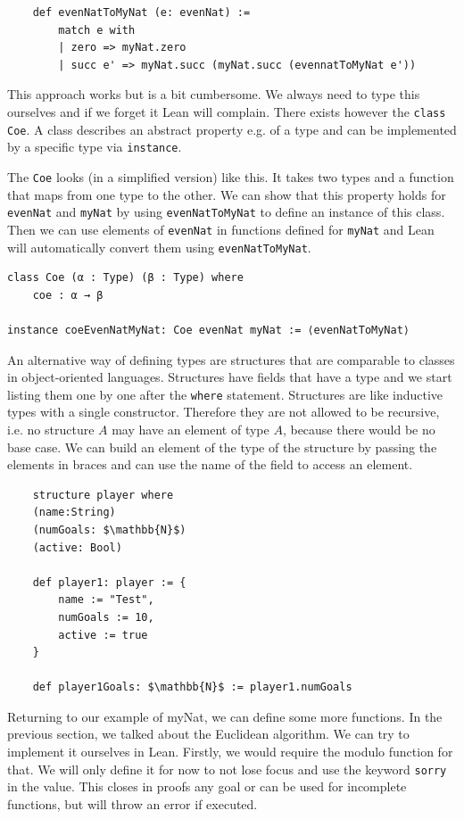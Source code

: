 \begin{lstlisting}
    def evenNatToMyNat (e: evenNat) := 
        match e with
        | zero => myNat.zero
        | succ e' => myNat.succ (myNat.succ (evennatToMyNat e'))
\end{lstlisting}

This approach works but is a bit cumbersome. We always need to type this ourselves and if we forget it Lean will complain. There exists however the \lstinline|class Coe|. A class describes an abstract property e.g. of a type and can be implemented by a specific type via \lstinline|instance|.

The \lstinline|Coe| looks (in a simplified version) like this. It takes two types and a function that maps from one type to the other. We can show that this property holds for \lstinline|evenNat| and \lstinline|myNat| by using \lstinline|evenNatToMyNat| to define an instance of this class. Then we can use elements of \lstinline|evenNat| in functions defined for \lstinline|myNat| and Lean will automatically convert them using \lstinline|evenNatToMyNat|.

\begin{lstlisting}
class Coe (α : Type) (β : Type) where
    coe : α → β

instance coeEvenNatMyNat: Coe evenNat myNat := ⟨evenNatToMyNat⟩
\end{lstlisting}

An alternative way of defining types are structures that are comparable to classes in object-oriented languages. Structures have fields that have a type and we start listing them one by one after the \lstinline|where| statement. Structures are like inductive types with a single constructor. Therefore they are not allowed to be recursive, i.e. no structure $A$ may have an element of type $A$, because there would be no base case.
We can build an element of the type of the structure by passing the elements in braces and can use the name of the field to access an element.

\begin{lstlisting}
    structure player where
    (name:String)
    (numGoals: $\mathbb{N}$)
    (active: Bool)

    def player1: player := {
        name := "Test",
        numGoals := 10,
        active := true
    }

    def player1Goals: $\mathbb{N}$ := player1.numGoals
\end{lstlisting}

Returning to our example of myNat, we can define some more functions. In the previous section, we talked about the Euclidean algorithm. We can try to implement it ourselves in Lean. Firstly, we would require the modulo function for that. We will only define it for now to not lose focus and use the keyword \lstinline|sorry| in the value. This closes in proofs any goal or can be used for incomplete functions, but will throw an error if executed.

